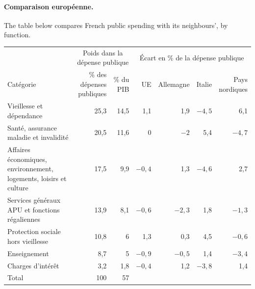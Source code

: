 \paragraph{Comparaison européenne.}
The table below compares French public spending with its neighbours', by
function.\\

\begin{center}
\begin{minipage}{\textwidth}
  \centering
  \footnotesize
  \begin{tabularx}{\textwidth}{@{}>{\raggedright\arraybackslash}Xrrrrrr@{}}
    \toprule
    & \multicolumn{2}{c}{Poids dans la dépense publique}
    & \multicolumn{4}{c}{Écart en \% de la dépense publique} \\
    \cmidrule(lr){2-3} \cmidrule(l){4-7}
    Catégorie & \shortstack[r]{\% des\\dépenses\\publiques} & \% du PIB & UE
      & Allemagne & Italie & \shortstack[r]{Pays\\nordiques} \\
    \midrule
    Vieillesse et dépendance & 25,3 & 14,5 & 1,1 & 1,9 & $-4{,}5$ & 6,1 \\
    Santé, assurance maladie et invalidité & 20,5 & 11,6 & 0 & $-2$ & 5,4 & $-4{,}7$ \\
    Affaires économiques, environnement, logements, loisirs et culture & 17,5 & 9,9 & $-0{,}4$ & 1,3 & $-4{,}6$ & 2,7 \\
    Services généraux APU et fonctions régaliennes & 13,9 & 8,1 & $-0{,}6$ & $-2{,}3$ & 1,8 & $-1{,}3$ \\
    Protection sociale hors vieillesse & 10,8 & 6 & 1,3 & 0,3 & 4,5 & $-0{,}6$ \\
    Enseignement & 8,7 & 5 & $-0{,}9$ & $-0{,}5$ & 1,4 & $-3{,}4$ \\
    Charges d'intérêt & 3,2 & 1,8 & $-0{,}4$ & 1,2 & $-3{,}8$ & 1,4 \\
    \midrule
    Total & 100 & 57 & & & & \\
    \bottomrule
  \end{tabularx}
\end{minipage}
\end{center}

